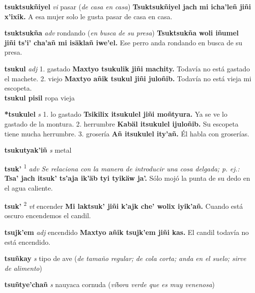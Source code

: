 \documentclass[10pt]{scrbook}
\newcommand{\entry}[1]{\textbf{#1}}
\newcommand{\onedefinition}[1]{#1.}
\newcommand{\defsuperscript}[1]{\textsuperscript{#1}}
\newcommand{\nontranslationdef}[1]{\textit{#1}}
\newcommand{\partofspeech}[1]{\textit{#1}}
\newcommand{\spanishtranslation}[1]{#1}
\newcommand{\clarification}[1]{(\textit{#1})}
\newcommand{\cholexample}[1]{\textbf{#1}}
\newcommand{\exampletranslation}[1]{#1}
\newcommand{\secondaryentry}[1]{\\\textbf{#1}}
\newcommand{\secondtranslation}[1]{#1}
\begin{document}
\begin{multicols}{2}
\entry{tsuktsukñiyel}
\partofspeech{vi}
\spanishtranslation{pasar}
\clarification{de casa en casa}
\cholexample{Tsuktsukñiyel jach mi icha'leñ jiñi x'ixik.}
\exampletranslation{A esa mujer solo le gusta pasar de casa en casa.}

\entry{tsuktsukña}
\partofspeech{adv}
\spanishtranslation{rondando}
\clarification{en busca de su presa}
\cholexample{Tsuktsukña woli iñumel jiñi ts'i' cha'añ mi isäklañ iwe'el.}
\exampletranslation{Ese perro anda rondando en busca de su presa.}

\entry{tsukul}
\partofspeech{adj}
\onedefinition{1}
\spanishtranslation{gastado}
\cholexample{Maxtyo tsukulik jiñi machity.}
\exampletranslation{Todavía no está gastado el machete.}
\onedefinition{2}
\spanishtranslation{viejo}
\cholexample{Maxtyo añik tsukul jiñi juloñib.}
\exampletranslation{Todavía no está vieja mi escopeta.}
\secondaryentry{tsukul pisil}
\secondtranslation{ropa vieja}

\entry{*tsukulel}
\partofspeech{s}
\onedefinition{1}
\spanishtranslation{lo gastado}
\cholexample{Tsikilix itsukulel jiñi moñtyura.}
\exampletranslation{Ya se ve lo gastado de la montura.}
\onedefinition{2}
\spanishtranslation{herrumbre}
\cholexample{Kabäl itsukulel ijuloñib.}
\exampletranslation{Su escopeta tiene mucha herrumbre.}
\onedefinition{3}
\spanishtranslation{grosería}
\cholexample{Añ itsukulel ity'añ.}
\exampletranslation{Él habla con groserías.}

\entry{tsukutyak'iñ}
\partofspeech{s}
\spanishtranslation{metal}

\entry{tsuk'}
\defsuperscript{1}
\partofspeech{adv}
\nontranslationdef{Se relaciona con la manera de introducir una cosa delgada; p. ej.:}
\cholexample{Tsa' jach itsuk' ts'aja ik'äb tyi tyikäw ja'.}
\exampletranslation{Sólo mojó la punta de su dedo en el agua caliente.}

\entry{tsuk'}
\defsuperscript{2}
\partofspeech{vt}
\spanishtranslation{encender}
\cholexample{Mi laktsuk' jiñi k'ajk che' wolix iyik'añ.}
\exampletranslation{Cuando está oscuro encendemos el candil.}

\entry{tsujk'em}
\partofspeech{adj}
\spanishtranslation{encendido}
\cholexample{Maxtyo añik tsujk'em jiñi kas.}
\exampletranslation{El candil todavía no está encendido.}

\entry{tsuñkay}
\partofspeech{s}
\spanishtranslation{tipo de ave}
\clarification{de tamaño regular; de cola corta; anda en el suelo; sirve de alimento}

\entry{tsuñtye'chañ}
\partofspeech{s}
\spanishtranslation{nauyaca cornuda}
\clarification{víbora verde que es muy venenosa}


\end{multicols}
\end{document}
